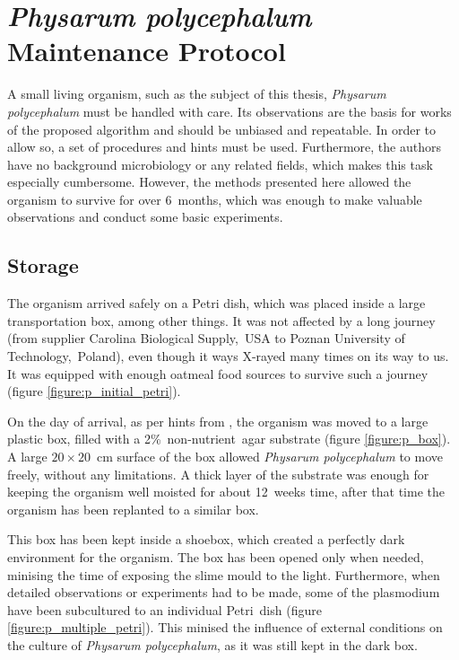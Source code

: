 \chapter{\textit{Physarum polycephalum} Maintenance Protocol}
\label{chapter:protocol}

A small living organism, such as the subject of this thesis, \textit{Physarum polycephalum} must be handled with care. Its observations are the basis for works of the proposed algorithm and should be unbiased and repeatable. In order to allow so, a set of procedures and hints must be used. Furthermore, the authors have no background microbiology or any related fields, which makes this task especially cumbersome. However, the methods presented here allowed the organism to survive for over 6~months, which was enough to make valuable observations and conduct some basic experiments.


\section*{Storage}

The organism arrived safely on a Petri dish, which was placed inside a large transportation box, among other things. It was not affected by a long journey (from supplier Carolina Biological Supply,~USA to Poznan University of Technology,~Poland), even though it ways X-rayed many times on its way to us. It was equipped with enough oatmeal food sources to survive such a journey (figure \ref{figure:p_initial_petri}).

On the day of arrival, as per hints from \cite{adamatzky2010physarum}, the organism was moved to a large plastic box, filled with a 2\%~non-nutrient~agar substrate (figure \ref{figure:p_box}). A large $20\times20$~cm surface of the box allowed \textit{Physarum polycephalum} to move freely, without any limitations. A thick layer of the substrate was enough for keeping the organism well moisted for about 12~weeks time, after that time the organism has been replanted to a similar box.

This box has been kept inside a shoebox, which created a perfectly dark environment for the organism. The box has been opened only when needed, minising the time of exposing the slime mould to the light. Furthermore, when detailed observations or experiments had to be made, some of the plasmodium have been subcultured to an individual Petri~dish (figure \ref{figure:p_multiple_petri}). This minised the influence of external conditions on the culture of \textit{Physarum polycephalum}, as it was still kept in the dark box. 

